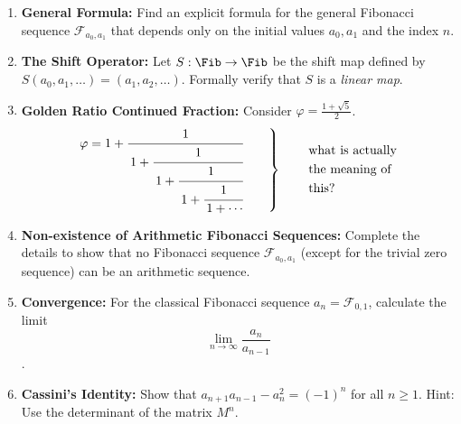 \begin{exercise}
\begin{enumerate}
    \item \textbf{General Formula:} Find an explicit formula for the general Fibonacci sequence $\mathcal{F}_{a_0, a_1}$ that depends only on the initial values $a_0, a_1$ and the index $n$.
    \item \textbf{The Shift Operator:} Let $S: \Fib \to \Fib$ be the shift map defined by $S(a_0, a_1, \dots) = (a_1, a_2, \dots)$. Formally verify that $S$ is a \textit{linear map}.
    \item \textbf{Golden Ratio Continued Fraction:} Consider $\varphi = \frac{1+\sqrt{5}}{2}$.
        \[
        \left.
        \begin{aligned}
        \varphi
        = 1+\cfrac{1}{\,1+\cfrac{1}{\,1+\cfrac{1}{\,1+\cfrac{1}{\,1+\cdots}}}}
        \end{aligned}
        \qquad
        \right\}
        \qquad
        \left.
        \begin{aligned}
        &\text{what is actually}\\
        &\text{the meaning of}\\
        &\text{this?}
        \end{aligned}
        \right.
        \]
    \item \textbf{Non-existence of Arithmetic Fibonacci Sequences:} Complete the details to show that no Fibonacci sequence $\mathcal{F}_{a_0, a_1}$ (except for the trivial zero sequence) can be an arithmetic sequence.
    \item \textbf{Convergence:} For the classical Fibonacci sequence $a_n = \mathcal{F}_{0,1}$, calculate the limit \[\lim_{n \to \infty} \frac{a_n}{a_{n-1}}\].
    \item \textbf{Cassini's Identity:} Show that $a_{n+1} a_{n-1} - a_n^2 = (-1)^n$ for all $n \ge 1$. Hint: Use the determinant of the matrix $M^n$.
\end{enumerate}
\end{exercise}